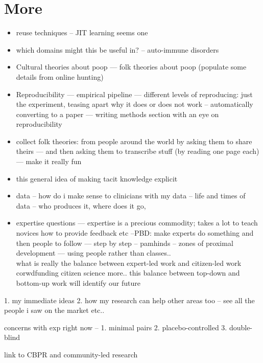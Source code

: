 \section{More} 

\begin{itemize}
\item reuse techniques -- JIT learning seems one
\item which domains might this be useful in?	
-- auto-immune disorders
\item Cultural theories about poop — folk theories about poop 
(populate some details from online hunting)
\item Reproducibility — empirical pipeline 
— different levels of reproducing: just the experiment, teasing apart why it does or does not work
-- automatically converting to a paper — writing methods section with an eye on reproducibility 
\item collect folk theories: from people around the world by asking them to share theirs
— and then asking them to transcribe stuff (by reading one page each) — make it really fun
\item this general idea of making tacit knowledge explicit 
\item data -- how do i make sense to clinicians with my data -- life and times of data -- who produces it, where does it go, 
\item expertise questions --- expertise is a precious commodity; takes a lot to teach novices how to provide feedback etc  --PBD: make experts do something and then people to follow — step by step -- pamhinds -- zones of proximal development — using people rather than classes.. \\
 what is really the balance between expert-led work and citizen-led work
    corwdfunding
    citizen science
    more.. 
this balance between top-down and bottom-up work will identify our future
\end{itemize}




1. my immediate ideas 
2. how my research can help other areas too -- see all the people i saw on the market etc..

concerns with exp right now -- 1. minimal pairs 
2. placebo-controlled
3. double-blind



link to CBPR and community-led research
